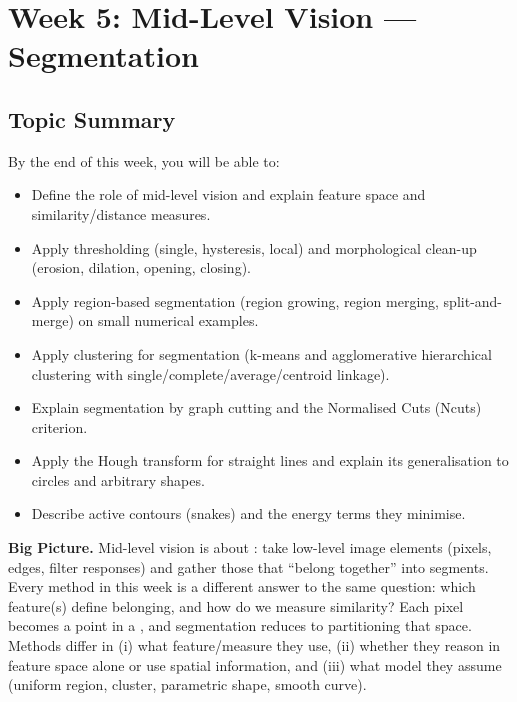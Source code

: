 \section{Week 5: Mid-Level Vision --- Segmentation}

\subsection{Topic Summary}

\begin{keybox}
By the end of this week, you will be able to:
\begin{itemize}
  \item Define the role of mid-level vision and explain feature space and similarity/distance measures.
  \item Apply thresholding (single, hysteresis, local) and morphological clean-up (erosion, dilation, opening, closing).
  \item Apply region-based segmentation (region growing, region merging, split-and-merge) on small numerical examples.
  \item Apply clustering for segmentation (k-means and agglomerative hierarchical clustering with single/complete/average/centroid linkage).
  \item Explain segmentation by graph cutting and the Normalised Cuts (Ncuts) criterion.
  \item Apply the Hough transform for straight lines and explain its generalisation to circles and arbitrary shapes.
  \item Describe active contours (snakes) and the energy terms they minimise.
\end{itemize}
\end{keybox}

\textbf{Big Picture.}
Mid-level vision is about : take low-level image elements (pixels, edges, filter responses) and gather those that ``belong together'' into segments. Every method in this week is a different answer to the same question: which feature(s) define belonging, and how do we measure similarity? Each pixel becomes a point in a , and segmentation reduces to partitioning that space. Methods differ in (i) what feature/measure they use, (ii) whether they reason in feature space alone or use spatial information, and (iii) what model they assume (uniform region, cluster, parametric shape, smooth curve).

